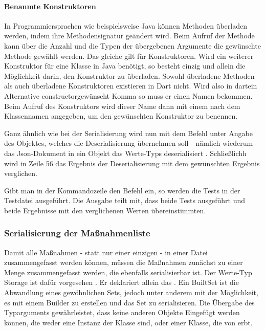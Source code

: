 \paragraph{Benanmte Konstruktoren} In Programmiersprachen wie beispielsweise Java können Methoden überladen werden, indem ihre Methodensignatur geändert wird. Beim Aufruf der Methode kann über die Anzahl und die Typen der übergebenen Argumente die gewünschte Methode gewählt werden. Das gleiche gilt für Konstruktoren. Wird ein weiterer Konstruktor für eine Klasse in Java benötigt, so besteht einzig und allein die Möglichkeit darin, den Konstruktor zu überladen. Sowohl überladene Methoden als auch überladene Konstruktoren existieren in Dart nicht. Wird also in dartein Alternative constructorgewünscht Komma so muss er einen Namen bekommen. Beim Aufruf des Konstruktors wird dieser Name dann mit einem  nach dem Klassennamen angegeben, um den gewünschten Konstruktor zu benennen.


Ganz ähnlich wie bei der Serialisierung wird nun mit dem Befehl    unter Angabe des Objektes, welches die Deserialisierung übernehmen soll - nämlich wiederum  - das Json-Dokument in ein Objekt das Werte-Typs  deserialisiert . Schließlichh wird in Zeile 56 das Ergebnis der Deserialisierung mit dem gewünschten Ergebnis verglichen.

 

Gibt man in der Kommandozeile den Befehl    ein, so werden die Tests in der Testdatei ausgeführt. Die Ausgabe  teilt mit, dass beide Tests ausgeführt und beide Ergebnisse mit den verglichenen Werten übereinstimmten.


\subsubsection{Serialisierung der Maßnahmenliste}

Damit alle Maßnahmen - statt nur einer einzigen - in einer Datei zusammengefasst werden können, müssen die Maßnahmen zunächst zu einer Menge zusammengefasst werden, die ebenfalls serialisierbar ist.
Der Werte-Typ Storage ist dafür vorgesehen \Lst{\ref{lst:Schritt1WerteTypStorage}}.
Er deklariert allein das  .
Ein BuiltSet ist die Abwandlung eines gewöhnlichen Sets, jedoch unter anderem mit der Möglichkeit, es mit einem Builder zu erstellen und das Set zu serialisieren.
Die Übergabe des Typarguments  gewährleistet, dass keine anderen Objekte Eingefügt werden können, die weder eine Instanz der Klasse  sind, oder einer Klasse, die von  erbt.  


